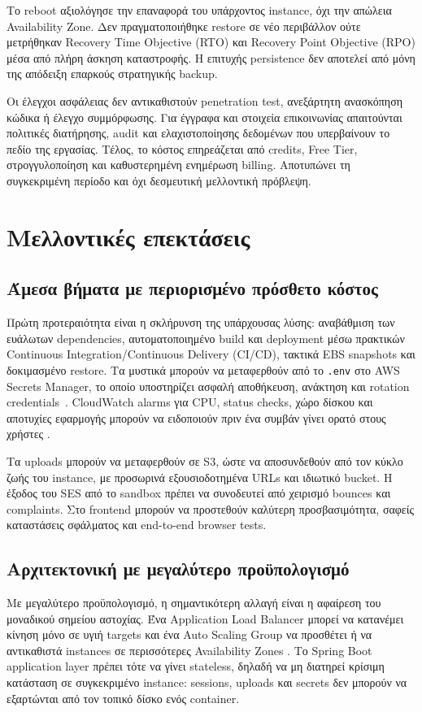Το reboot αξιολόγησε την επαναφορά του υπάρχοντος instance, όχι την απώλεια
Availability Zone. Δεν πραγματοποιήθηκε restore σε νέο περιβάλλον ούτε
μετρήθηκαν Recovery Time Objective (RTO) και Recovery Point Objective (RPO)
μέσα από πλήρη άσκηση καταστροφής. Η επιτυχής persistence δεν αποτελεί από
μόνη της απόδειξη επαρκούς στρατηγικής backup.

Οι έλεγχοι ασφάλειας δεν αντικαθιστούν penetration test, ανεξάρτητη
ανασκόπηση κώδικα ή έλεγχο συμμόρφωσης. Για έγγραφα και στοιχεία επικοινωνίας
απαιτούνται πολιτικές διατήρησης, audit και ελαχιστοποίησης δεδομένων που
υπερβαίνουν το πεδίο της εργασίας. Τέλος, το κόστος επηρεάζεται από credits,
Free Tier, στρογγυλοποίηση και καθυστερημένη ενημέρωση billing. Αποτυπώνει
τη συγκεκριμένη περίοδο και όχι δεσμευτική μελλοντική πρόβλεψη.

\section{Μελλοντικές επεκτάσεις}
\subsection{Άμεσα βήματα με περιορισμένο πρόσθετο κόστος}
Πρώτη προτεραιότητα είναι η σκλήρυνση της υπάρχουσας λύσης: αναβάθμιση των
ευάλωτων dependencies, αυτοματοποιημένο build και deployment μέσω πρακτικών
Continuous Integration/Continuous Delivery (CI/CD), τακτικά EBS
snapshots και δοκιμασμένο restore. Τα μυστικά μπορούν να μεταφερθούν από το
\texttt{.env} στο AWS Secrets Manager, το οποίο υποστηρίζει ασφαλή αποθήκευση,
ανάκτηση και rotation credentials~\cite{aws2026secretsmanager}. CloudWatch
alarms για CPU, status checks, χώρο δίσκου και αποτυχίες εφαρμογής μπορούν να
ειδοποιούν πριν ένα συμβάν γίνει ορατό στους χρήστες
\cite{aws2026cloudwatchalarms}.

Τα uploads μπορούν να μεταφερθούν σε S3, ώστε να αποσυνδεθούν από τον κύκλο
ζωής του instance, με προσωρινά εξουσιοδοτημένα URLs και ιδιωτικό bucket. Η
έξοδος του SES από το sandbox πρέπει να συνοδευτεί από χειρισμό bounces και
complaints. Στο frontend μπορούν να προστεθούν καλύτερη προσβασιμότητα,
σαφείς καταστάσεις σφάλματος και end-to-end browser tests.

\subsection{Αρχιτεκτονική με μεγαλύτερο προϋπολογισμό}
Με μεγαλύτερο προϋπολογισμό, η σημαντικότερη αλλαγή είναι η αφαίρεση του
μοναδικού σημείου αστοχίας. Ένα Application Load Balancer μπορεί να
κατανέμει κίνηση μόνο σε υγιή targets και ένα Auto Scaling Group να προσθέτει
ή να αντικαθιστά instances σε περισσότερες Availability Zones
\cite{aws2026elbasg}. Το Spring Boot application layer πρέπει τότε να γίνει
stateless, δηλαδή να μη διατηρεί κρίσιμη κατάσταση σε συγκεκριμένο instance:
sessions, uploads και secrets δεν μπορούν να εξαρτώνται από τον τοπικό δίσκο
ενός container.

